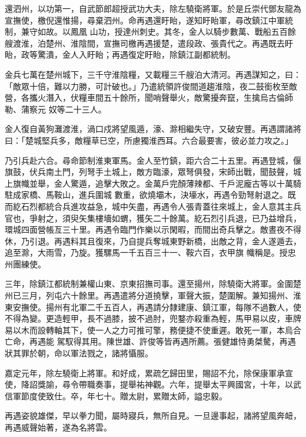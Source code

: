 \begin{pinyinscope}
 還泗州，以功第一，自武節郎超授武功大夫，除左驍衛將軍。於是丘崇代鄧友龍為宣撫使，檄倪還惟揚，尋棄泗州。命再遇還盱眙，遂知盱眙軍，尋改鎮江中軍統制，兼守如故。以鳳凰
 山功，授達州刺史。其冬，金人以騎步數萬、戰船五百餘艘渡淮，泊楚州、淮陰間，宣撫司檄再遇援楚，遣段政、張貴代之。再遇既去盱眙，政等驚潰，金人入盱眙；再遇復定盱眙，除鎮江副都統制。



 金兵七萬在楚州城下，三千守淮陰糧，又載糧三千艘泊大清河。再遇謀知之，曰：「敵眾十倍，難以力勝，可計破也。」乃遣統領許俊間道趨淮陰，夜二鼓銜枚至敵營，各攜火潛入，伏糧車間五十餘所，聞哨聲舉火，敵驚擾奔竄，生擒烏古倫師勒、蒲察元
 奴等二十三人。



 金人復自黃狗灘渡淮，渦口戍將望風遁，濠、滁相繼失守，又破安豐。再遇謂諸將曰：「楚城堅兵多，敵糧草已空，所慮獨淮西耳。六合最要害，彼必並力攻之。」



 乃引兵赴六合。尋命節制淮東軍馬。金人至竹鎮，距六合二十五里。再遇登城，偃旗鼓，伏兵南土門，列弩手土城上，敵方臨濠，眾弩俱發，宋師出戰，聞鼓聲，城上旗幟並舉，金人驚遁，追擊大敗之。金萬戶完顏薄辣都、千戶泥龐古等以十萬騎駐成家橋、馬鞍山，進兵圍城
 數重，欲燒壩木，決壕水，再遇令勁弩射退之。既而紇石烈都統合兵進攻益急，城中矢盡，再遇令人張青蓋往來城上，金人意其主兵官也，爭射之，須臾矢集樓墻如蝟，獲矢二十餘萬。紇石烈引兵退，已乃益增兵，環城四面營帳亙三十里。再遇令臨門作樂以示閑暇，而間出奇兵擊之。敵晝夜不得休，乃引退。再遇料其且復來，乃自提兵奪城東野新橋，出敵之背，金人遂遁去，追至滁，大雨雪，乃旋。獲騾馬一千五百三十一、鞍六百，衣甲旗
 幟稱是。授忠州團練使。



 三年，除鎮江都統制兼權山東、京東招撫司事。還至揚州，除驍衛大將軍。金圍楚州已三月，列屯六十餘里。再遇遣將分道撓擊，軍聲大振，楚圍解。兼知揚州、淮東安撫使。揚州有北軍二千五百人，再遇請分隸建康、鎮江軍，每隊不過數人，使不得為變。更造輕甲，長不過膝，披不過肘，兜鍪亦殺重為輕，馬甲易以皮，車牌易以木而設轉軸其下，使一人之力可推可擎，務便捷不使重遲。敢死一軍，本烏合亡命，再遇能
 駕馭得其用。陳世雄、許俊等皆再遇所薦。張健雄恃勇桀驁，再遇狀其罪於朝，命以軍法戮之，諸將懾服。



 嘉定元年，除左驍衛上將軍。和好成，累疏乞歸田里，賜詔不允，除保康軍承宣使，降詔獎諭，尋令帶職奏事，提舉祐神觀。六年，提舉太平興國宮，十年，以武信軍節度使致仕。卒，年七十。贈太尉，累贈太師，謚忠毅。



 再遇姿貌雄傑，早以拳力聞，屬時寢兵，無所自見。一旦邊事起，諸將望風奔衄，再遇威聲始著，遂為名將雲。




\end{pinyinscope}
